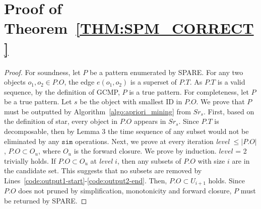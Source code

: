 \section{Proof of Theorem~\ref{THM:SPM_CORRECT}}
\label{apx:spm_correct}
\begin{proof}
For soundness, let $P$ be a pattern enumerated by SPARE. For any two objects $o_1, o_2 \in P.O$, the edge $e(o_1,o_2)$ is a superset of $P.T$. 
As $P.T$ is a valid sequence, by the definition of GCMP, $P$ is a true pattern.
For completeness, let $P$ be a true pattern. Let $s$ be the object with smallest ID in $P.O$. We prove that $P$ must be outputted by Algorithm~\ref{algo:apriori_mining} from $Sr_s$. 
First, based on the definition of star, every object in $P.O$ appears in $Sr_s$. Since $P.T$ is decomposable, then by Lemma 3 %
the time sequence of %
any subset would not be eliminated by any $\mathtt{sim}$ operations.  Next, we prove at every iteration \emph{level} $\leq |P.O|$, $P.O \subset O_u$, where $O_u$ is the forward closure. We prove by induction. $level$ = 2 trivially holds. If $P.O \subset O_u$ at \emph{level $i$}, then any subsets of $P.O$ with size $i$ are in the candidate set. %
This suggests that no subsets are removed by Lines~\ref{code:output1-start}-\ref{code:output2-end}. Then, $P.O \subset U_{i+1}$ holds. Since $P.O$ does not pruned by simplification, monotonicity and forward closure, $P$ must be returned by SPARE.
\end{proof}